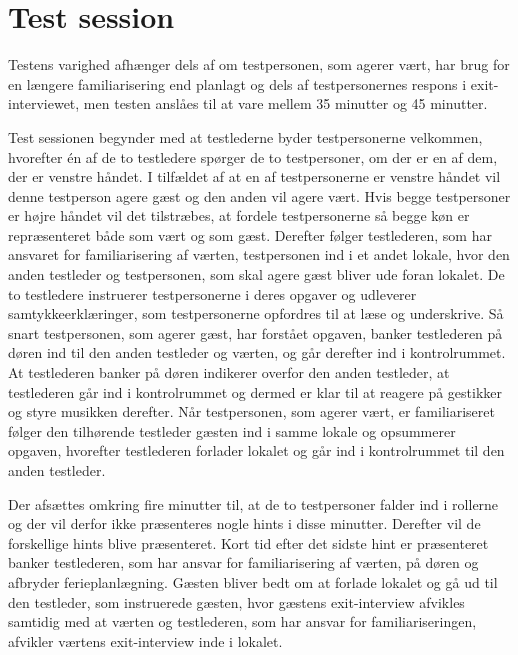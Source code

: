 \section{Test session}
\label{TestSessionSocialAccept}
%
Testens varighed afhænger dels af om testpersonen, som agerer vært, har brug for en længere familiarisering end planlagt og dels af testpersonernes respons i exit-interviewet, men testen anslåes til at vare mellem 35 minutter og 45 minutter. 

Test sessionen begynder med at testlederne byder testpersonerne velkommen, hvorefter én af de to testledere spørger de to testpersoner, om der er en af dem, der er venstre håndet. I tilfældet af at en af testpersonerne er venstre håndet vil denne testperson agere gæst og den anden vil agere vært. Hvis begge testpersoner er højre håndet vil det tilstræbes, at fordele testpersonerne så begge køn er repræsenteret både som vært og som gæst. Derefter følger testlederen, som har ansvaret for familiarisering af værten, testpersonen ind i et andet lokale, hvor den anden testleder og testpersonen, som skal agere gæst bliver ude foran lokalet. De to testledere instruerer testpersonerne i deres opgaver og udleverer samtykkeerklæringer, som testpersonerne opfordres til at læse og underskrive. Så snart testpersonen, som agerer gæst, har forstået opgaven, banker testlederen på døren ind til den anden testleder og værten, og går derefter ind i kontrolrummet. At testlederen banker på døren indikerer overfor den anden testleder, at testlederen går ind i kontrolrummet og dermed er klar til at reagere på gestikker og styre musikken derefter. Når testpersonen, som agerer vært, er familiariseret følger den tilhørende testleder gæsten ind i samme lokale og opsummerer opgaven, hvorefter testlederen forlader lokalet og går ind i kontrolrummet til den anden testleder. 

Der afsættes omkring fire minutter til, at de to testpersoner falder ind i rollerne og der vil derfor ikke præsenteres nogle hints i disse minutter. Derefter vil de forskellige hints blive præsenteret. Kort tid efter det sidste hint er præsenteret banker testlederen, som har ansvar for familiarisering af værten, på døren og afbryder ferieplanlægning. Gæsten bliver bedt om at forlade lokalet og gå ud til den testleder, som instruerede gæsten, hvor gæstens exit-interview afvikles samtidig med at værten og testlederen, som har ansvar for familiariseringen, afvikler værtens exit-interview inde i lokalet. 